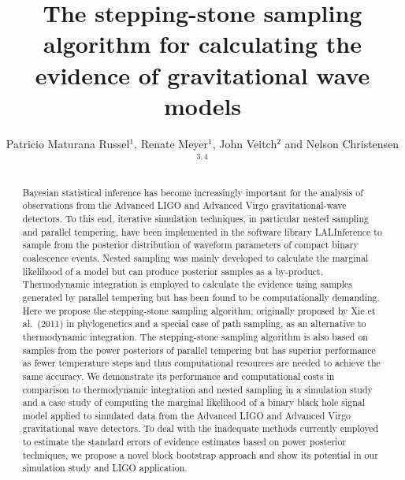 \documentclass[aps,reprint,amsmath,amssymb,showpacs,showkeys]{revtex4-1}%
\begin{document}
\graphicspath{{figures/}}	

\title[Stepping-stone sampling algorithm for evidence computation]{The stepping-stone sampling algorithm for calculating the evidence of gravitational wave models}

\author{Patricio Maturana Russel$^{1}$, Renate Meyer$^1$, John Veitch$^2$ and Nelson Christensen$^{3,4}$}


\begin{abstract}
Bayesian statistical inference has become increasingly important for the analysis of observations from the Advanced LIGO and Advanced Virgo gravitational-wave detectors. To this end, iterative simulation techniques, in particular nested sampling and parallel tempering, have been implemented in the software library LALInference to sample from the posterior distribution of waveform parameters of compact binary coalescence events. Nested sampling was  mainly developed to calculate the marginal likelihood of a model but can produce posterior samples as a by-product. Thermodynamic integration is employed to calculate the evidence using samples generated by parallel tempering but has been found to be computationally demanding. Here we propose the stepping-stone sampling algorithm, originally proposed by Xie et al.\ (2011) in phylogenetics  and a special case of path sampling, as an alternative to thermodynamic integration.  The stepping-stone sampling algorithm is also based on samples from the power posteriors of parallel tempering but has  superior performance as fewer temperature steps and thus computational resources are needed to achieve the same accuracy.  We demonstrate its performance and computational costs in comparison to thermodynamic integration and nested sampling in a simulation study and a case study of computing the marginal likelihood of a binary black hole signal model applied to simulated data from the Advanced LIGO and Advanced Virgo gravitational wave detectors. To deal with the inadequate methods currently employed to estimate the standard errors of evidence estimates based on power posterior techniques, we propose a novel block bootstrap  approach and show its potential in our simulation study and LIGO application.
\end{abstract}
\end{document}

